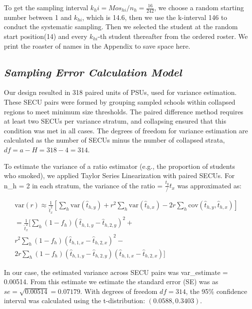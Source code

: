 \documentclass[
  12pt]{article}
\begin{document}
To get the sampling interval \(k_hi = Mos_{hi} / n_h = \frac{16}{242}\),
we choose a random starting number between 1 and \(k_{hi}\), which is
14.6, then we use the k-interval 146 to conduct the systematic sampling.
Then we selected the student at the random start position(14) and every
\(k_{hi}\)-th student thereafter from the ordered roster. We print the
roaster of names in the Appendix to save space here.

\subsection{\texorpdfstring{\emph{Sampling Error Calculation
Model}}{Sampling Error Calculation Model}}\label{sampling-error-calculation-model}

Our design resulted in 318 paired units of PSUs, used for variance
estimation. These SECU pairs were formed by grouping sampled schools
within collapsed regions to meet minimum size thresholds. The paired
difference method requires at least two SECUs per variance stratum, and
collapsing ensured that this condition was met in all cases. The degrees
of freedom for variance estimation are calculated as the number of SECUs
minus the number of collapsed strata, \(df=a-H=318-4=314\).

To estimate the variance of a ratio estimator (e.g., the proportion of
students who smoked), we applied Taylor Series Linearization with paired
SECUs. For n\_h = 2 in each stratum, the variance of the ratio =
\(\frac{t_y}/{t_x}\) was approximated as:

\begin{align*}
   \text{var}(r) \approx \frac{1}{\hat{t}_x^2} \left[ \sum_h \text{var}(\hat{t}_{h,y}) + r^2 \sum_h      \text{var}(\hat{t}_{h,x}) - 2r \sum_h \text{cov}(\hat{t}_{h,y}, \hat{t}_{h,x}) \right] \\
   = \frac{1}{\hat{t}_x^2}  \Biggr[  \sum_h (1 - f_h)(\hat{t}_{h,1,y} - \hat{t}_{h,2,y})^2 + \\
r^2 \sum_h (1 - f_h)(\hat{t}_{h,1,x} - \hat{t}_{h,2,x})^2 - \\
2r \sum_h (1 - f_h)(\hat{t}_{h,1,y} - \hat{t}_{h,2,y})(\hat{t}_{h,1,x} - \hat{t}_{h,2,x}) \Biggr]
\end{align*}

In our case, the estimated variance across SECU pairs was var\_estimate
= 0.00514. From this estimate we estimate the standard error (SE) was as
\(se = \sqrt{0.00514} = 0.07179\). With degrees of freedom \(df=314\),
the 95\% confidence interval was calculated using the t-distribution:
\((0.0588 , 0.3403)\).
\end{document}
